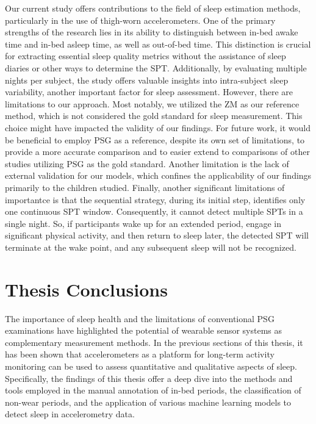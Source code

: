 \documentclass[
  10pt,
]{scrbook}
\begin{document}
Our current study offers contributions to the field of sleep estimation
methods, particularly in the use of thigh-worn accelerometers. One of
the primary strengths of the research lies in its ability to distinguish
between in-bed awake time and in-bed asleep time, as well as out-of-bed
time. This distinction is crucial for extracting essential sleep quality
metrics without the assistance of sleep diaries or other ways to
determine the SPT. Additionally, by evaluating multiple nights per
subject, the study offers valuable insights into intra-subject sleep
variability, another important factor for sleep assessment. However,
there are limitations to our approach. Most notably, we utilized the ZM
as our reference method, which is not considered the gold standard for
sleep measurement. This choice might have impacted the validity of our
findings. For future work, it would be beneficial to employ PSG as a
reference, despite its own set of limitations, to provide a more
accurate comparison and to easier extend to comparisons of other studies
utilizing PSG as the gold standard. Another limitation is the lack of
external validation for our models, which confines the applicability of
our findings primarily to the children studied. Finally, another
significant limitations of importantce is that the sequential strategy,
during its initial step, identifies only one continuous SPT window.
Consequently, it cannot detect multiple SPTs in a single night. So, if
participants wake up for an extended period, engage in significant
physical activity, and then return to sleep later, the detected SPT will
terminate at the wake point, and any subsequent sleep will not be
recognized.

\hypertarget{thesis-conclusions}{%
\chapter{Thesis Conclusions}\label{thesis-conclusions}}

The importance of sleep health and the limitations of conventional PSG
examinations have highlighted the potential of wearable sensor systems
as complementary measurement methods. In the previous sections of this
thesis, it has been shown that accelerometers as a platform for
long-term activity monitoring can be used to assess quantitative and
qualitative aspects of sleep. Specifically, the findings of this thesis
offer a deep dive into the methods and tools employed in the manual
annotation of in-bed periods, the classification of non-wear periods,
and the application of various machine learning models to detect sleep
in accelerometry data.
\end{document}
